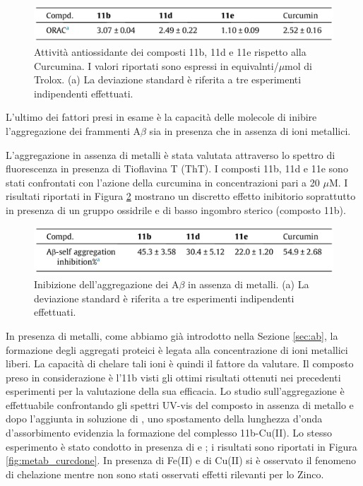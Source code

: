 \documentclass[a4paper, 12pt]{article}
\begin{document}
\begin{figure}[H]
	\centering
	\includegraphics[width=\linewidth]{immagini/roi_curcdone.png}
	\caption{Attività antiossidante dei composti 11b, 11d e 11e rispetto alla Curcumina. I valori riportati sono espressi in equivalnti/$\mu$mol di Trolox. (a) La deviazione standard è riferita a tre esperimenti indipendenti effettuati.}
	\label{fig:roi_curcdone}
\end{figure}


L'ultimo dei fattori presi in esame è la capacità delle molecole di inibire l'aggregazione dei frammenti A$\beta$ sia in presenza che in assenza di ioni metallici.

L'aggregazione in assenza di metalli è stata valutata attraverso lo spettro di fluorescenza in presenza di Tioflavina T (ThT). I composti 11b, 11d e 11e sono stati confrontati con l'azione della curcumina in concentrazioni pari a 20 $\mu$M. I risultati riportati in Figura \ref{fig:selfab_curcdone} mostrano un discretto effetto inibitorio soprattutto in presenza di un gruppo ossidrile e di basso ingombro sterico (composto 11b).

\begin{figure}[H]
	\centering
	\includegraphics[width=\linewidth]{immagini/selfab_curcdone.png}
	\caption{Inibizione dell'aggregazione dei A$\beta$ in assenza di metalli. (a) La deviazione standard è riferita a tre esperimenti indipendenti effettuati.}
	\label{fig:selfab_curcdone}
\end{figure}

In presenza di metalli, come abbiamo già introdotto nella Sezione \ref{sec:ab}, la formazione degli aggregati proteici è legata alla concentrazione di ioni metallici liberi. La capacità di chelare tali ioni è quindi il fattore da valutare. Il composto preso in considerazione è l'11b visti gli ottimi risultati ottenuti nei precedenti esperimenti per la valutazione della sua efficacia. Lo studio sull'aggregazione è effettuabile confrontando gli spettri UV-vis del composto in assenza di metallo e dopo l'aggiunta in soluzione di , uno spostamento della lunghezza d'onda d'assorbimento evidenzia la formazione del complesso 11b-Cu(II). Lo stesso esperimento è stato condotto in presenza di  e ; i risultati sono riportati in Figura \ref{fig:metab_curcdone}. In presenza di Fe(II) e di Cu(II) si è osservato il fenomeno di chelazione mentre non sono stati osservati effetti rilevanti per lo Zinco. \cite{jun_yan_design_2017}
\end{document}
